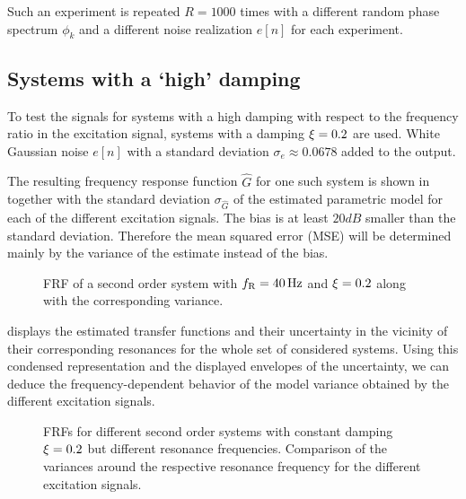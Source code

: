   Such an experiment is repeated $R=1000$ times with a different random phase  spectrum $\phi_k$ and a different noise realization $e[n]$ for each experiment.

  \subsection{Systems with a `high' damping}
  To test the signals for systems with a high damping with respect to the frequency ratio in the excitation signal, systems with a damping $\damping = 0.2$ are used.
  White Gaussian noise $e[n]$ with a standard deviation $\sigma_e \approx 0.0678$ added to the output.

  The resulting frequency response function $\hat{G}$ for one such system is shown in  together with the standard deviation $\sigma_{\hat{G}}$ of the estimated parametric model for each of the different excitation signals.
  The bias is at least $20\unit{dB}$ smaller than the standard  deviation.
  Therefore the mean squared error (MSE) will be determined mainly by the variance of the estimate instead of the bias.

  \begin{figure}[th]
    \centering
    \setlength\figureheight{5cm}
    \setlength{}
    
    \caption[Simulated FRF and its variance for different excitation signals.]{FRF of a second order system with $f_{\mathrm{R}}=40\,\mathrm{Hz}$ and $\damping=0.2$
             along with the corresponding variance.}%
    \label{fig:FRF1}
  \end{figure}

   displays the estimated transfer functions and their uncertainty in the vicinity of their corresponding resonances for the whole set of considered systems.
  Using this condensed representation and the displayed envelopes of the uncertainty, we can deduce the frequency-dependent behavior of the model variance obtained by the different excitation signals.

  \begin{figure}%
    \centering
    \setlength\figureheight{5cm}
    \setlength{}
    
    \caption[Simulated FRFs and their variances of systems with $\damping=0.2$ for different excitation signals.]{FRFs for different second order systems with constant damping
             $\damping=0.2$ but different resonance frequencies. Comparison of the
             variances around the respective resonance frequency for the different
             excitation signals.}%
    \label{fig:damping02}
  \end{figure}

